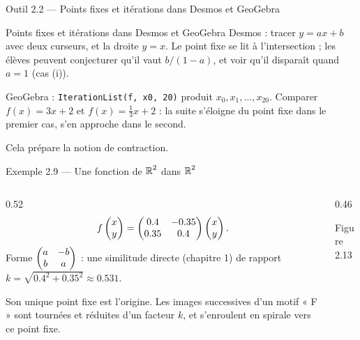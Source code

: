 \begin{frame}{Outil 2.2 --- Points fixes et itérations dans Desmos et GeoGebra}
  \begin{Outil}{Points fixes et itérations dans Desmos et GeoGebra}
    \small
    Desmos : tracer $y=ax+b$ avec deux curseurs, et la droite
    $y=x$. Le point fixe se lit à l'intersection ; les élèves peuvent
    conjecturer qu'il vaut $b/(1-a)$, et voir qu'il disparaît quand
    $a=1$ (cas (i)).
    \vspace{4pt}

    GeoGebra : \texttt{IterationList(f, x0, 20)} produit
    $x_0,x_1,\dots,x_{20}$. Comparer $f(x)=3x+2$ et
    $f(x)=\tfrac13x+2$ : la suite s'éloigne du point fixe dans le
    premier cas, s'en approche dans le second.
    \vspace{4pt}

    Cela prépare la notion de contraction.
  \end{Outil}
\end{frame}

\begin{frame}{Exemple 2.9 --- Une fonction de $\operatorname{\mathbb{R}}^2$ dans $\operatorname{\mathbb{R}}^2$}
  \begin{columns}[c]
    \begin{column}{0.52\textwidth}
      \small
      \[
        f\begin{pmatrix}x\\ y\end{pmatrix} = \begin{pmatrix}\num{0.4} & \num{-0.35}\\ \num{0.35} & \num{0.4}\end{pmatrix}\begin{pmatrix}x\\ y\end{pmatrix}.
      \]
      Forme $\begin{pmatrix}a & -b\\ b & a\end{pmatrix}$ : une similitude directe (chapitre 1)
      de rapport
      $k=\sqrt{\num{0.4}^2+\num{0.35}^2}\approx\num{0.531}$.
      \vspace{6pt}

      Son unique point fixe est l'origine. Les images successives d'un
      motif « F » sont tournées et réduites d'un facteur $k$, et
      s'enroulent en spirale vers ce point fixe.
    \end{column}
    \begin{column}{0.46\textwidth}
      \begin{center}\scriptsize Figure 2.13\end{center}
    \end{column}
  \end{columns}
\end{frame}


